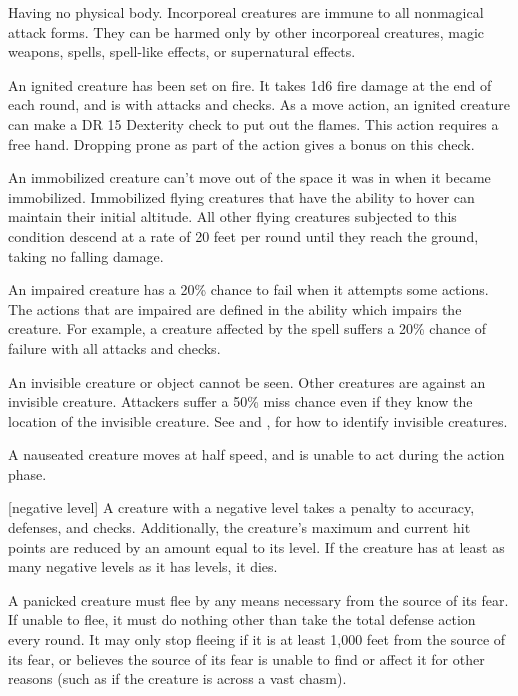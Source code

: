  Having no physical body. Incorporeal creatures are immune to all nonmagical attack forms. They can be harmed only by other incorporeal creatures, magic weapons, spells, spell-like effects, or supernatural effects.

 An ignited creature has been set on fire. It takes 1d6 fire damage at the end of each round, and is \impaired with attacks and checks. As a move action, an ignited creature can make a DR 15 Dexterity check to put out the flames. This action requires a free hand. Dropping prone as part of the action gives a  bonus on this check.

 An immobilized creature can't move out of the space it was in when it became immobilized. Immobilized flying creatures that have the ability to hover can maintain their initial altitude. All other flying creatures subjected to this condition descend at a rate of 20 feet per round until they reach the ground, taking no falling damage.

 An impaired creature has a 20\% chance to fail when it attempts some actions. The actions that are impaired are defined in the ability which impairs the creature. For example, a creature affected by the  spell suffers a 20\% chance of failure with all attacks and checks.

 An invisible creature or object cannot be seen. Other creatures are  against an invisible creature. Attackers suffer a 50\% miss chance even if they know the location of the invisible creature. See  and , for how to identify invisible creatures.


 A nauseated creature moves at half speed, and is unable to act during the action phase.

[negative level] A creature with a negative level takes a  penalty to accuracy, defenses, and checks. Additionally, the creature's maximum and current hit points are reduced by an amount equal to its level. If the creature has at least as many negative levels as it has levels, it dies.

 A panicked creature must flee by any means necessary from the source of its fear. If unable to flee, it must do nothing other than take the total defense action every round. It may only stop fleeing if it is at least 1,000 feet from the source of its fear, or believes the source of its fear is unable to find or affect it for other reasons (such as if the creature is across a vast chasm).

